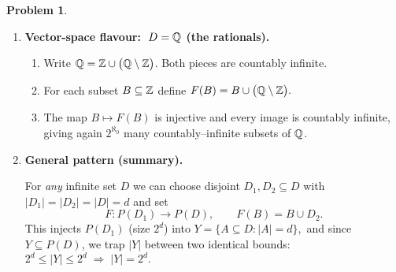 \documentclass[12pt]{article}
\theoremstyle{definition} %
\newtheorem{problem}{Problem}
\theoremstyle{plain} %
\begin{document}
\begin{problem}
\begin{enumerate}
    \item \textbf{Vector‑space flavour: $\;D=\Bbb Q$ (the rationals).}

          \begin{enumerate}
              \item Write $\Bbb Q=\Bbb Z\cup\bigl(\Bbb Q\setminus\Bbb Z\bigr)$.
                    Both pieces are countably infinite.
              \item For each subset $B\subseteq\Bbb Z$ define
                    \(
                        F(B)=B\cup\bigl(\Bbb Q\setminus\Bbb Z\bigr).
                    \)
              \item The map $B\mapsto F(B)$ is injective and every image is
                    countably infinite, giving again $2^{\aleph_{0}}$ many
                    countably–infinite subsets of $\Bbb Q$.
          \end{enumerate}

    \item \textbf{General pattern (summary).}

          For \emph{any} infinite set $D$ we can choose disjoint
          $D_{1},D_{2}\subseteq D$ with
          $|D_{1}|=|D_{2}|=|D|=d$ and set
          \[
              F:P(D_{1})\to P(D),\qquad F(B)=B\cup D_{2}.
          \]
          This injects $P(D_{1})$ (size $2^{d}$) into
          \(
              Y=\{A\subseteq D:|A|=d\},
          \)
          and since $Y\subseteq P(D)$, we trap $|Y|$ between two identical
          bounds:
          \(
              2^{d}\le |Y|\le 2^{d}\;\Longrightarrow\;|Y|=2^{d}.
          \)
          \qedhere
    \end{enumerate}
\end{problem}
\end{document}
